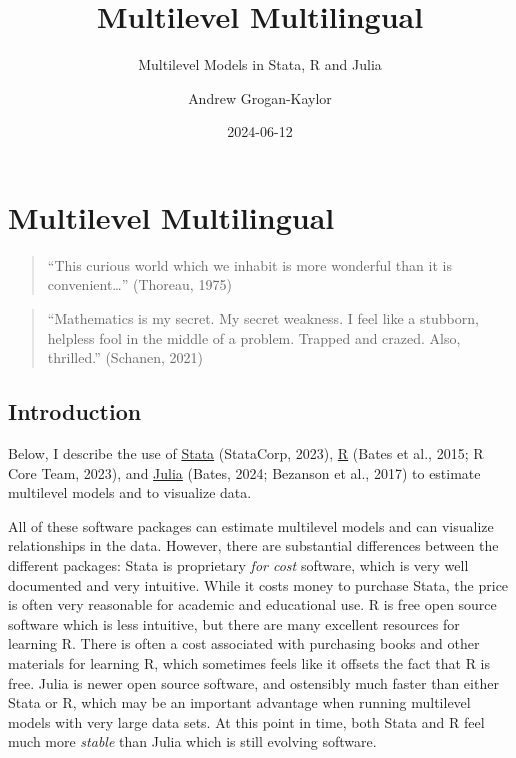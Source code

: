 \documentclass[
  letterpaper,
  DIV=11,
  numbers=noendperiod]{scrreprt}
\title{Multilevel Multilingual}
\subtitle{Multilevel Models in Stata, R and Julia}
\author{Andrew Grogan-Kaylor}
\date{2024-06-12}
\renewcommand*\contentsname{Table of contents}
\newcommand\contentsname{Table of contents}
\begin{document}
\maketitle

\renewcommand*\contentsname{Table of contents}
{
\hypersetup{linkcolor=}
\setcounter{tocdepth}{2}
\tableofcontents
}
\listoftables
{}

\chapter{Multilevel Multilingual}\label{multilevel-multilingual}

\begin{quote}
``This curious world which we inhabit is more wonderful than it is
convenient\ldots{}'' (Thoreau, 1975)
\end{quote}

\begin{quote}
``Mathematics is my secret. My secret weakness. I feel like a stubborn,
helpless fool in the middle of a problem. Trapped and crazed. Also,
thrilled.'' (Schanen, 2021)
\end{quote}

\section{Introduction}\label{introduction}

Below, I describe the use of \href{https://www.stata.com/}{Stata}
(StataCorp, 2023), \href{https://www.r-project.org/}{R} (Bates et al.,
2015; R Core Team, 2023), and \href{https://www.julialang.org/}{Julia}
(Bates, 2024; Bezanson et al., 2017) to estimate multilevel models and
to visualize data.

All of these software packages can estimate multilevel models and can
visualize relationships in the data. However, there are substantial
differences between the different packages: Stata is proprietary
\emph{for cost} software, which is very well documented and very
intuitive. While it costs money to purchase Stata, the price is often
very reasonable for academic and educational use. R is free open source
software which is less intuitive, but there are many excellent resources
for learning R. There is often a cost associated with purchasing books
and other materials for learning R, which sometimes feels like it
offsets the fact that R is free. Julia is newer open source software,
and ostensibly much faster than either Stata or R, which may be an
important advantage when running multilevel models with very large data
sets. At this point in time, both Stata and R feel much more
\emph{stable} than Julia which is still evolving software.
\end{document}
